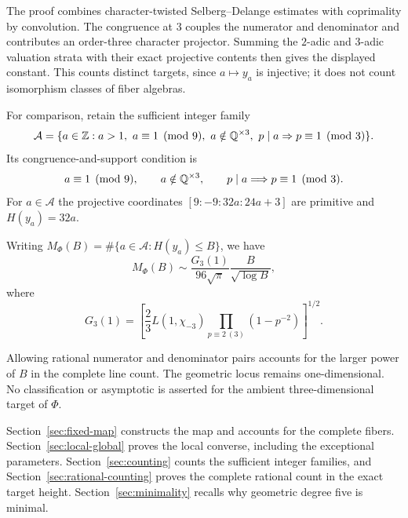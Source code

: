 The proof combines character-twisted Selberg--Delange estimates with
coprimality by convolution. The congruence at \(3\) couples the numerator
and denominator and contributes an order-three character projector.
Summing the \(2\)-adic and \(3\)-adic valuation strata with their exact
projective contents then gives the displayed constant. This counts
distinct targets, since \(a\mapsto y_a\) is injective; it does not count
isomorphism classes of fiber algebras.

For comparison, retain the sufficient integer family
\begin{equation}
 \mathcal A=\{a\in\Z:a>1,\ a\equiv1\pmod9,\ a\notin\Q^{\times3},
 \ p\mid a\Rightarrow p\equiv1\pmod3\}.
 \label{eq:parameter-family}
\end{equation}
Its congruence-and-support condition is
\begin{equation}
 a\equiv1\pmod9,\qquad a\notin\mathbb Q^{\times3},\qquad
 p\mid a\Longrightarrow p\equiv1\pmod3.
 \label{eq:parameter-conditions}
\end{equation}
For \(a\in\mathcal A\) the projective coordinates
\([9:-9:32a:24a+3]\) are primitive and \(H(y_a)=32a\).

\begin{theorem}\label{thm:count-intro}
Writing \(M_\Phi(B)=\#\{a\in\mathcal A:H(y_a)\le B\}\), we have
\begin{equation}
 M_\Phi(B)\sim\frac{G_3(1)}{96\sqrt\pi}
 \frac{B}{\sqrt{\log B}},
 \label{eq:count-intro}
\end{equation}
where
\begin{equation}
 G_3(1)=\left[\frac23L(1,\chi_{-3})
 \prod_{p\equiv2\ (3)}(1-p^{-2})\right]^{1/2}.
 \label{eq:g3-intro}
\end{equation}
\end{theorem}

Allowing rational numerator and denominator pairs accounts for the larger
power of \(B\) in the complete line count. The geometric locus remains
one-dimensional. No classification or asymptotic is asserted for the
ambient three-dimensional target of \(\Phi\).

Section~\ref{sec:fixed-map} constructs the map and accounts for the complete
fibers. Section~\ref{sec:local-global} proves the local converse, including
the exceptional parameters. Section~\ref{sec:counting} counts the
sufficient integer families, and Section~\ref{sec:rational-counting} proves
the complete rational count in the exact target height.
Section~\ref{sec:minimality} recalls why geometric degree five is minimal.
